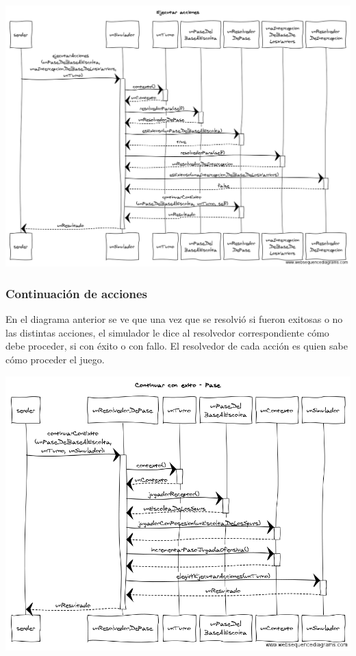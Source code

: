 \begin{center}
\includegraphics[scale=0.45, angle=90]{diseno/Ejecutar_acciones.png}
\end{center}

\subsubsection{Continuación de acciones}

En el diagrama anterior se ve que una vez que se resolvió si fueron exitosas o no las distintas acciones, el simulador le dice al resolvedor correspondiente cómo debe proceder, si con éxito o con fallo. El resolvedor de cada acción es quien sabe cómo proceder el juego. 

\begin{center}
\includegraphics[scale=0.45]{diseno/Continuar_con_exito_pase.png}
\end{center}

